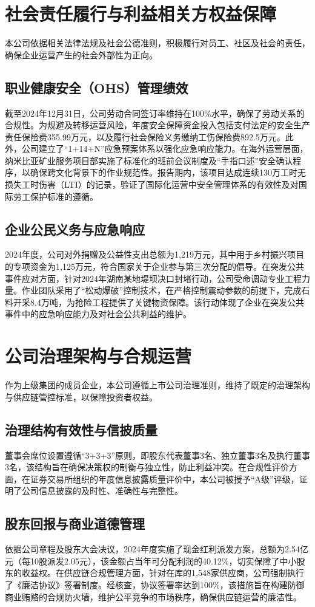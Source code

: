 \documentclass[a4paper,12pt]{article}
\begin{document}
\section{社会责任履行与利益相关方权益保障}

本公司依据相关法律法规及社会公德准则，积极履行对员工、社区及社会的责任，确保企业运营产生的社会外部性为正向。

\subsection{职业健康安全（OHS）管理绩效}

截至2024年12月31日，公司劳动合同签订率维持在100\%水平，确保了劳动关系的合规性。为规避及转移运营风险，年度安全保障资金投入包括支付法定的安全生产责任保险费355.99万元，以及履行社会保险义务缴纳工伤保险费892.5万元。此外，公司建立了“1+14+N”应急预案体系以强化应急响应能力。在海外运营层面，纳米比亚矿业服务项目部实施了标准化的班前会议制度及“手指口述”安全确认程序，以确保跨文化背景下的作业规范性。报告期内，该项目达成连续130万工时无损失工时伤害（LTI）的记录，验证了国际化运营中安全管理体系的有效性及对国际劳工保护标准的遵循。

\subsection{企业公民义务与应急响应}

2024年度，公司对外捐赠及公益性支出总额为1,219万元，其中用于乡村振兴项目的专项资金为1,125万元，符合国家关于企业参与第三次分配的倡导。在突发公共事件应对方面，针对2024年湖南某地堤坝决口封堵行动，公司受命调动专业工程力量。作业团队采用了“松动爆破”控制技术，在严格控制震动参数的前提下，完成石料开采8.4万吨，为抢险工程提供了关键物资保障。该行动体现了企业在突发公共事件中的应急响应能力及对社会公共利益的维护。

\section{公司治理架构与合规运营}

作为上级集团的成员企业，本公司遵循上市公司治理准则，维持了既定的治理架构与供应链管控标准，以保障投资者权益。

\subsection{治理结构有效性与信披质量}

董事会席位设置遵循“3+3+3”原则，即股东代表董事3名、独立董事3名及执行董事3名，该结构旨在确保决策权的制衡与独立性，防止利益冲突。在合规性评价方面，在证券交易所组织的年度信息披露质量评价中，本公司被授予“A级”评级，证明了公司信息披露的及时性、准确性与完整性。

\subsection{股东回报与商业道德管理}

依据公司章程及股东大会决议，2024年度实施了现金红利派发方案，总额为2.54亿元（每10股派发2.05元），该金额占当年可分配利润的40.12\%，切实保障了中小股东的收益权。在供应链合规管理方面，针对在库的1,548家供应商，公司强制执行了《廉洁协议》签署制度。经核查，协议签署率达到100\%，该措施旨在构建防御商业贿赂的合规防火墙，维护公平竞争的市场秩序，确保供应链运营的廉洁性。
\end{document}
